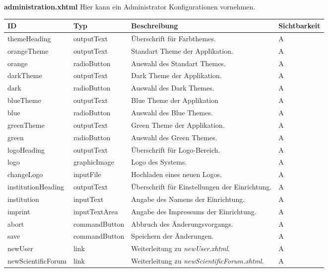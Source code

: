 \textbf{administration.xhtml} Hier kann ein Administrator Konfigurationen vornehmen.

\begin{tabular}[H]{|m{2cm}|m{3cm}|m{6cm}|m{2.5cm}|}
    \hline
    \textbf{ID} & \textbf{Typ} & \textbf{Beschreibung} & \textbf{Sichtbarkeit} \\
    \hline
    \hline
    themeHeading & outputText & Überschrift für Farbthemes. & A\\
    \hline
    orangeTheme & outputText & Standart Theme der Applikation. & A\\
    \hline
    orange & radioButton & Auswahl des Standart Themes. & A\\
    \hline
    darkTheme & outputText & Dark Theme der Applikation. & A\\
    \hline
    dark & radioButton & Auswahl des Dark Themes. & A\\
    \hline
    blueTheme & outputText & Blue Theme der Applikation & A\\
    \hline
    blue & radioButton & Auswahl des Blue Themes. & A\\
    \hline
    greenTheme & outputText & Green Theme der Applikation. & A\\
    \hline
    green & radioButton & Auswahl des Green Themes. & A\\
    \hline
    logoHeading & outputText & Überschrift für Logo-Bereich. & A\\
    \hline
    logo & graphicImage & Logo des Systems. & A\\
    \hline
    changeLogo & inputFile & Hochladen eines neuen Logos. & A\\
    \hline
    institutionHeading & outputText & Überschrift für Einstellungen der Einrichtung. & A\\
    \hline
    institution & inputText & Angabe des Namens der Einrichtung. & A\\
    \hline
    imprint & inputTextArea & Angabe des Impressums der Einrichtung. & A\\
    \hline
    abort & commandButton & Abbruch des Änderungsvorgangs. & A \\
    \hline
    save & commandButton & Speichern der Änderungen. & A\\
    \hline
    newUser & link & Weiterleitung zu \emph{newUser.xhtml}. & A\\
    \hline
    newScientificForum & link & Weiterleitung zu \emph{newScientificForum.xhtml}. & A\\
    \hline
\end{tabular}

